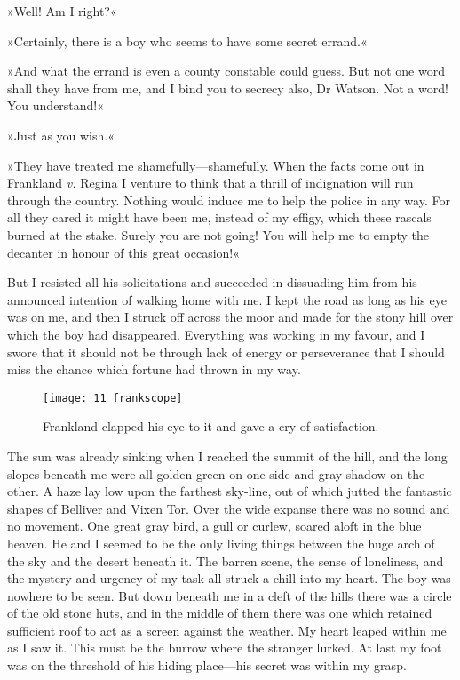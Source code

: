 »Well! Am I right?«

»Certainly, there is a boy who seems to have some secret errand.«

»And what the errand is even a county constable could guess. But not one word shall they have from me, and I bind you to secrecy also, Dr Watson. Not a word! You understand!«

»Just as you wish.«

»They have treated me shamefully—shamefully. When the facts come out in Frankland \textit{v.} Regina I venture to think that a thrill of indignation will run through the country. Nothing would induce me to help the police in any way. For all they cared it might have been me, instead of my effigy, which these rascals burned at the stake. Surely you are not going! You will help me to empty the decanter in honour of this great occasion!«

But I resisted all his solicitations and succeeded in dissuading him from his announced intention of walking home with me. I kept the road as long as his eye was on me, and then I struck off across the moor and made for the stony hill over which the boy had disappeared. Everything was working in my favour, and I swore that it should not be through lack of energy or perseverance that I should miss the chance which fortune had thrown in my way.

\begin{figure}[tbh]
\centering
\texttt{[image: 11\_frankscope]}
\caption{Frankland clapped his eye to it and gave a cry of satisfaction.}
\end{figure}

The sun was already sinking when I reached the summit of the hill, and the long slopes beneath me were all golden-green on one side and gray shadow on the other. A haze lay low upon the farthest sky-line, out of which jutted the fantastic shapes of Belliver and Vixen Tor. Over the wide expanse there was no sound and no movement. One great gray bird, a gull or curlew, soared aloft in the blue heaven. He and I seemed to be the only living things between the huge arch of the sky and the desert beneath it. The barren scene, the sense of loneliness, and the mystery and urgency of my task all struck a chill into my heart. The boy was nowhere to be seen. But down beneath me in a cleft of the hills there was a circle of the old stone huts, and in the middle of them there was one which retained sufficient roof to act as a screen against the weather. My heart leaped within me as I saw it. This must be the burrow where the stranger lurked. At last my foot was on the threshold of his hiding place—his secret was within my grasp.

